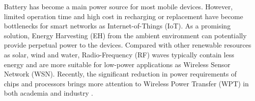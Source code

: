 Battery has become a main power source for most mobile devices. However, limited operation time and high cost in recharging or replacement have become bottlenecks for smart networks as Internet-of-Things (IoT). As a promising solution, Energy Harvesting (EH) from the ambient environment can potentially provide perpetual power to the devices. Compared with other renewable resources as solar, wind and water, Radio-Frequency (RF) waves typically contain less energy and are more suitable for low-power applications as Wireless Sensor Network (WSN). Recently, the significant reduction in power requirements of chips and processors brings more attention to Wireless Power Transfer (WPT) in both academia and industry \cite{R.Varshney2008, Grover2010, Zhang2013, Hui2014, Krikidis2014, Valenta2014, Boshkovska2015, Ding2015, Costanzo2016, Clerckx2018a}.

